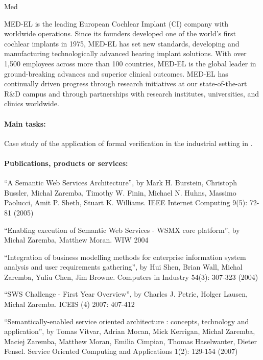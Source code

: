 \begin{sitedescription}{Med}


MED-EL is the leading European Cochlear Implant (CI) company with worldwide operations. Since its founders developed one of the world’s first cochlear implants in 1975, MED-EL has set new standards, developing and manufacturing technologically advanced hearing implant solutions. With over 1,500 employees across more than 100 countries, MED-EL is the global leader in ground-breaking advances and superior clinical outcomes. MED-EL has continually driven progress through research initiatives at our state-of-the-art R\&D campus and through partnerships with research institutes, universities, and clinics worldwide.

\paragraph*{Main tasks:}

\begin{compactitem}
\item Case study of the application of formal verification in the industrial setting in .
\end{compactitem}

\paragraph*{Publications, products or services:}

\begin{compactitem}
\item ``A Semantic Web Services Architecture'', by Mark H. Burstein, Christoph Bussler, Michal Zaremba, Timothy W. Finin, Michael N. Huhns, Massimo Paolucci, Amit P. Sheth, Stuart K. Williams. IEEE Internet Computing 9(5): 72-81 (2005)
\item ``Enabling execution of Semantic Web Services - WSMX core platform'', by Michal Zaremba, Matthew Moran. WIW 2004
\item ``Integration of business modelling methods for enterprise information system analysis and user requirements gathering'', by Hui Shen, Brian Wall, Michal Zaremba, Yuliu Chen, Jim Browne. Computers in Industry 54(3): 307-323 (2004)
\item ``SWS Challenge - First Year Overview'', by Charles J. Petrie, Holger Lausen, Michal Zaremba. ICEIS (4) 2007: 407-412
\item ``Semantically-enabled service oriented architecture : concepts, technology and application'', by Tomas Vitvar, Adrian Mocan, Mick Kerrigan, Michal Zaremba, Maciej Zaremba, Matthew Moran, Emilia Cimpian, Thomas Haselwanter, Dieter Fensel. Service Oriented Computing and Applications 1(2): 129-154 (2007)
\end{compactitem}


\end{sitedescription}
